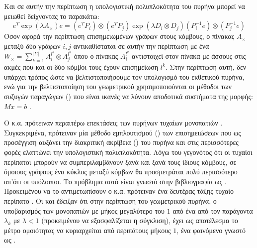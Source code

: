 Και σε αυτήν την περίπτωση η υπολογιστική πολυπλοκότητα του πυρήνα μπορεί να μειωθεί δείχνοντας το παρακάτω:
\begin{equation}
    e^T\exp(\lambda A_{\times}) e = (e^T P_{i}) \otimes (e^T P_{j})\exp(\lambda D_{i} \otimes D_{j}) (P_{i}^{-1} e) \otimes (P_{j}^{-1} e)
\end{equation}
Όσον αφορά την περίπτωση επισημειωμένων γράφων στους κόμβους, ο πίνακας $Α_{\times}$ μεταξύ δύο γράφων $i, j$ αντικαθίσταται σε αυτήν την περίπτωση με ένα $W_{\times} = \sum_{k=1}^{|\Sigma|}A_{i}^{l^{k}}\otimes A_{j}^{l^{k}}$ όπου ο πίνακας $A_{i}^{l^{k}}$ αντιστοιχεί στον πίνακα με άσσους στις ακμές που και οι δύο κόμβοι τους έχουν επισημείωση $l^{k}$.
Στην περίπτωση αυτή, δεν υπάρχει τρόπος ώστε να βελτιστοποιήσουμε τον υπολογισμό του εκθετικού πυρήνα, ενώ για την βελτιστοποίηση του γεωμετρικού χρησιμοποιούνται οι μέθοδοι των συζυγών παραγώγων () που είναι ικανές να λύνουν αποδοτικά συστήματα της μορφής: $Mx = b$ \cite{cgm}.\par
Ο  κ.α. πρότειναν περαιτέρω επεκτάσεις των πυρήνων τυχαίων μονοπατιών \cite{mahe2004extensions}.
Συγκεκριμένα, πρότειναν μία μέθοδο εμπλουτισμού () των επισημειώσεων που ως προσέγγιση αυξάνει την διακριτική ακρίβεια () του πυρήνα και στις περισσότερες φορές ελαττώνει την υπολογιστική πολυπλοκότητα.
Λόγω του γεγονότος ότι οι τυχαίοι περίπατοι μπορούν να συμπεριλαμβάνουν ξανά και ξανά τους ίδιους κόμβους, σε όμοιους γράφους ένα κύκλος μεταξύ κόμβων θα προσμετράται πολύ περισσότερο απ'ότι οι υπόλοιποι. Το πρόβλημα αυτό είναι γνωστό στην βιβλιογραφία ως .
Προκειμένου να το αντιμετωπίσουν ο  κ.α. πρότειναν ένα δευτέρας τάξης τυχαίο περίπατο .
Οι  και  έδειξαν ότι στην περίπτωση του γεωμετρικού πυρήνα, ο υποβαρισμός των μονοπατιών με μήκος μεγαλύτερο του $1$ από ένα από τον παράγοντα $λ_{k}$ με $λ<1$ (προκειμένου να εξασφαλίζεται η σύγκλιση), έχει ως αποτέλεσμα το μέτρο ομοιότητας να κυριαρχείται από περιπάτους μήκους $1$, ένα φαινόμενο γνωστό ως  \cite{sugiyama2015halting}.

